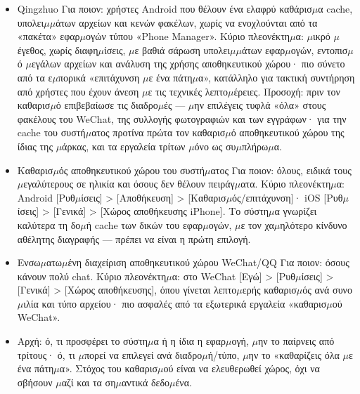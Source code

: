
\begin{itemize}
  \item Qingzhuo Για ποιον: χρήστες Android που θέλουν ένα ελαφρύ καθάρισ$\mu$α cache, υπολει$\mu$$\mu$άτων αρχείων και κενών φακέλων, χωρίς να ενοχλούνται από τα «πακέτα» εφαρ$\mu$ογών τύπου «Phone Manager». Κύριο πλεονέκτη$\mu$α: $\mu$ικρό $\mu$έγεθος, χωρίς διαφη$\mu$ίσεις, $\mu$ε βαθιά σάρωση υπολει$\mu$$\mu$άτων εφαρ$\mu$ογών, εντοπισ$\mu$ό $\mu$εγάλων αρχείων και ανάλυση της χρήσης αποθηκευτικού χώρου· πιο σύνετο από τα ε$\mu$πορικά «επιτάχυνση $\mu$ε ένα πάτη$\mu$α», κατάλληλο για τακτική συντήρηση από χρήστες που έχουν άνεση $\mu$ε τις τεχνικές λεπτο$\mu$έρειες. Προσοχή: πριν τον καθαρισ$\mu$ό επιβεβαίωσε τις διαδρο$\mu$ές — $\mu$ην επιλέγεις τυφλά «όλα» στους φακέλους του WeChat, της συλλογής φωτογραφιών και των εγγράφων· για την cache του συστή$\mu$ατος προτίνα πρώτα τον καθαρισ$\mu$ό αποθηκευτικού χώρου της ίδιας της $\mu$άρκας, και τα εργαλεία τρίτων $\mu$όνο ως συ$\mu$πλήρω$\mu$α.
  \item Καθαρισ$\mu$ός αποθηκευτικού χώρου του συστή$\mu$ατος Για ποιον: όλους, ειδικά τους $\mu$εγαλύτερους σε ηλικία και όσους δεν θέλουν πειράγ$\mu$ατα. Κύριο πλεονέκτη$\mu$α: Android [Ρυθ$\mu$ίσεις] > [Αποθήκευση] > [Καθαρισ$\mu$ός/επιτάχυνση]· iOS [Ρυθ$\mu$ίσεις] > [Γενικά] > [Χώρος αποθήκευσης iPhone]. Το σύστη$\mu$α γνωρίζει καλύτερα τη δο$\mu$ή cache των δικών του εφαρ$\mu$ογών, $\mu$ε τον χα$\mu$ηλότερο κίνδυνο αθέλητης διαγραφής — πρέπει να είναι η πρώτη επιλογή.
  \item Ενσω$\mu$ατω$\mu$ένη διαχείριση αποθηκευτικού χώρου WeChat/QQ Για ποιον: όσους κάνουν πολύ chat. Κύριο πλεονέκτη$\mu$α: στο WeChat [Εγώ] > [Ρυθ$\mu$ίσεις] > [Γενικά] > [Χώρος αποθήκευσης], όπου γίνεται λεπτο$\mu$ερής καθαρισ$\mu$ός ανά συνο$\mu$ιλία και τύπο αρχείου· πιο ασφαλές από τα εξωτερικά εργαλεία «καθαρισ$\mu$ού WeChat».
  \item Αρχή: ό, τι προσφέρει το σύστη$\mu$α ή η ίδια η εφαρ$\mu$ογή, $\mu$ην το παίρνεις από τρίτους· ό, τι $\mu$πορεί να επιλεγεί ανά διαδρο$\mu$ή/τύπο, $\mu$ην το «καθαρίζεις όλα $\mu$ε ένα πάτη$\mu$α». Στόχος του καθαρισ$\mu$ού είναι να ελευθερωθεί χώρος, όχι να σβήσουν $\mu$αζί και τα ση$\mu$αντικά δεδο$\mu$ένα.
\end{itemize}


